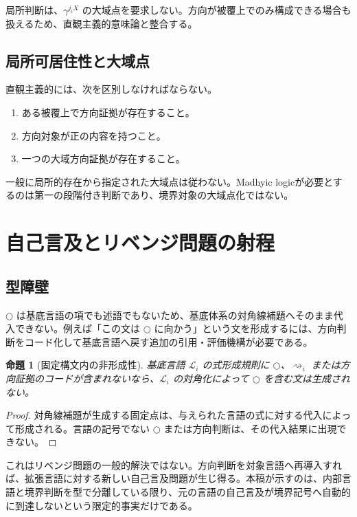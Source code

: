 \documentclass[a4paper,11pt]{ltjsarticle}
\theoremstyle{definition}
\theoremstyle{plain}
\newtheorem{proposition}[definition]{命題}
\newcommand{\dfix}{\bigcirc}
\begin{document}
局所判断は、$\gamma^{j_iX}$ の大域点を要求しない。方向が被覆上でのみ構成できる場合も扱えるため、直観主義的意味論と整合する\cite{FourmanScott1979,Grayson1979,johnstone}。

\subsection{局所可居住性と大域点}

直観主義的には、次を区別しなければならない。
\begin{enumerate}
 \item ある被覆上で方向証拠が存在すること。
 \item 方向対象が正の内容を持つこと。
 \item 一つの大域方向証拠が存在すること。
\end{enumerate}
一般に局所的存在から指定された大域点は従わない。Madhyic logicが必要とするのは第一の段階付き判断であり、境界対象の大域点化ではない。

\section{自己言及とリベンジ問題の射程}

\subsection{型障壁}

$\dfix$ は基底言語の項でも述語でもないため、基底体系の対角線補題へそのまま代入できない。例えば「この文は $\dfix$ に向かう」という文を形成するには、方向判断をコード化して基底言語へ戻す追加の引用・評価機構が必要である。

\begin{proposition}[固定構文内の非形成性]
基底言語 $\mathcal L_i$ の式形成規則に $\dfix$、$\rightsquigarrow_i$ または方向証拠のコードが含まれないなら、$\mathcal L_i$ の対角化によって $\dfix$ を含む文は生成されない。
\end{proposition}

\begin{proof}
対角線補題が生成する固定点は、与えられた言語の式に対する代入によって形成される。言語の記号でない $\dfix$ または方向判断は、その代入結果に出現できない。
\end{proof}

これはリベンジ問題の一般的解決ではない。方向判断を対象言語へ再導入すれば、拡張言語に対する新しい自己言及問題が生じ得る。本稿が示すのは、内部言語と境界判断を型で分離している限り、元の言語の自己言及が境界記号へ自動的に到達しないという限定的事実だけである。
\end{document}

